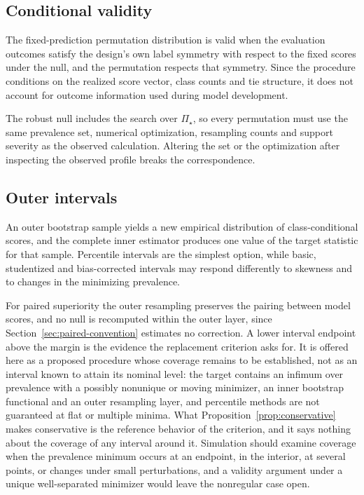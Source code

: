 \documentclass[11pt]{article}
\newcommand{\PSet}{\Pi_\star}
\theoremstyle{remark}
\begin{document}
\subsection{Conditional validity}

The fixed-prediction permutation distribution is valid when the evaluation outcomes satisfy the design's own label symmetry with respect to the fixed scores under the null, and the permutation respects that symmetry. Since the procedure conditions on the realized score vector, class counts and tie structure, it does not account for outcome information used during model development.

The robust null includes the search over $\PSet$, so every permutation must use the same prevalence set, numerical optimization, resampling counts and support severity as the observed calculation. Altering the set or the optimization after inspecting the observed profile breaks the correspondence.

\subsection{Outer intervals}

An outer bootstrap sample yields a new empirical distribution of class-conditional scores, and the complete inner estimator produces one value of the target statistic for that sample. Percentile intervals are the simplest option, while basic, studentized and bias-corrected intervals may respond differently to skewness and to changes in the minimizing prevalence.

For paired superiority the outer resampling preserves the pairing between model scores, and no null is recomputed within the outer layer, since Section~\ref{sec:paired-convention} estimates no correction. A lower interval endpoint above the margin is the evidence the replacement criterion asks for. It is offered here as a proposed procedure whose coverage remains to be established, not as an interval known to attain its nominal level: the target contains an infimum over prevalence with a possibly nonunique or moving minimizer, an inner bootstrap functional and an outer resampling layer, and percentile methods are not guaranteed at flat or multiple minima. What Proposition~\ref{prop:conservative} makes conservative is the reference behavior of the criterion, and it says nothing about the coverage of any interval around it. Simulation should examine coverage when the prevalence minimum occurs at an endpoint, in the interior, at several points, or changes under small perturbations, and a validity argument under a unique well-separated minimizer would leave the nonregular case open.
\end{document}
